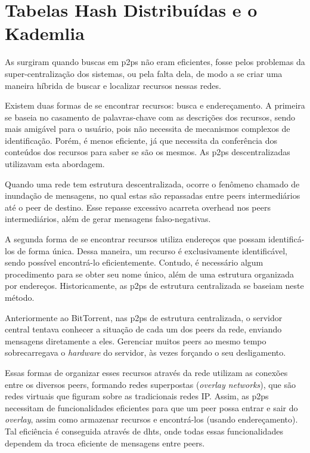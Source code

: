 
\newpage
\section{Tabelas Hash Distribuídas e o Kademlia}

As  surgiram quando buscas em \glspl{p2p} não eram eficientes, fosse
pelos problemas da super-centralização dos sistemas, ou pela falta dela, de modo a se
criar uma maneira híbrida de buscar e localizar recursos nessas redes.

Existem duas formas de se encontrar recursos: busca e endereçamento. A primeira se
baseia no casamento de palavras-chave com as descrições dos recursos, sendo mais
amigável para o usuário, pois não necessita de mecanismos complexos de identificação.
Porém, é menos eficiente, já que necessita da conferência dos conteúdos dos recursos
para saber se são os mesmos. As \glspl*{p2p} descentralizadas utilizavam esta abordagem.

Quando uma rede tem estrutura descentralizada, ocorre o fenômeno chamado de inundação
de mensagens, no qual estas são repassadas entre \glspl*{peer} intermediários até o
\gls*{peer} de destino. Esse repasse excessivo acarreta \gls{overhead} nos \glspl*{peer}
intermediários, além de gerar mensagens falso-negativas.

A segunda forma de se encontrar recursos utiliza endereços que possam identificá-los de
forma única. Dessa maneira, um recurso é exclusivamente identificável, sendo possível
encontrá-lo eficientemente. Contudo, é necessário algum procedimento para se obter seu
nome único, além de uma estrutura organizada por endereços. Historicamente, as
\glspl*{p2p} de estrutura centralizada se baseiam neste método.

Anteriormente ao BitTorrent, nas \glspl*{p2p} de estrutura centralizada, o servidor
central tentava conhecer a situação de cada um dos \glspl*{peer} da rede, enviando
mensagens diretamente a eles. Gerenciar muitos \glspl*{peer} ao mesmo tempo
sobrecarregava o \emph{hardware} do servidor, às vezes forçando o seu desligamento.

Essas formas de organizar esses recursos através da rede utilizam as conexões entre os
diversos \glspl*{peer}, formando redes superpostas (\emph{overlay networks}), que são
redes virtuais que figuram sobre as tradicionais redes IP. Assim, as \glspl*{p2p}
necessitam de funcionalidades eficientes para que um \gls*{peer} possa entrar e sair do
\emph{overlay}, assim como armazenar recursos e encontrá-los (usando endereçamento). Tal
eficiência é conseguida através de \glspl{dht}, onde todas essas funcionalidades
dependem da troca eficiente de mensagens entre \glspl*{peer}.

